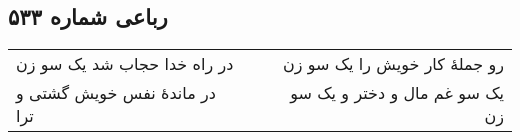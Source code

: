 \begin{center}
\section*{رباعی شماره ۵۳۳}
\label{sec:sh533}
\begin{longtable}{l p{0.5cm} r}
در راه خدا حجاب شد یک سو زن
&&
رو جملهٔ کار خویش را یک سو زن
\\
در ماندهٔ نفس خویش گشتی و ترا
&&
یک سو غم مال و دختر و یک سو زن
\\
\end{longtable}
\end{center}
